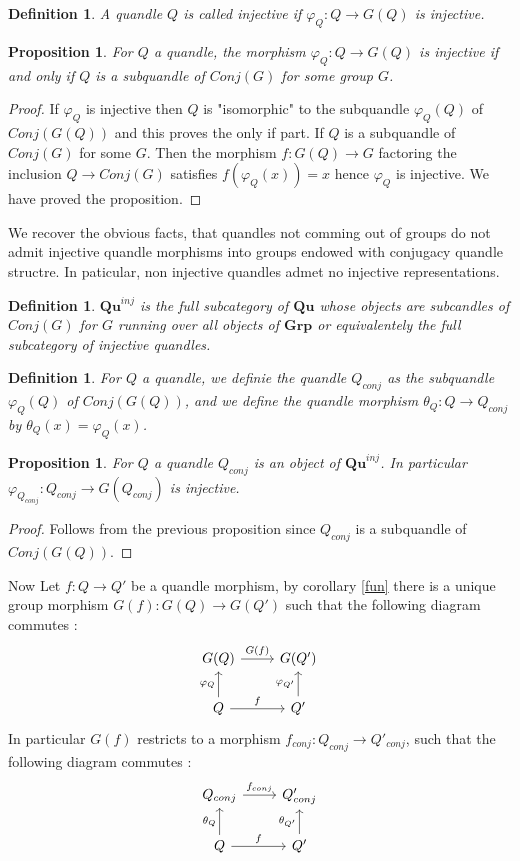 \documentclass[12pt, reqno]{amsart}
\newtheorem{proposition}[theorem]{Proposition}
\newtheorem{definition}[theorem]{Definition}
\newcommand{\Q}{{\mathbf{Qu}}}
\newcommand{\G}{{\mathbf{Grp}}}
\begin{document}
\begin{definition}
A quandle $Q$ is called injective if $\varphi_Q :Q \to G(Q)$ is injective. 
\end{definition}
\begin{proposition}
For $Q$ a quandle, the morphism $\varphi_Q:Q\to G(Q)$ is injective if and only if $Q$ is a subquandle of $Conj(G)$ for some group $G$.
\end{proposition}
\begin{proof}
If $\varphi_Q$ is injective then $Q$ is "isomorphic" to the subquandle $\varphi_Q(Q)$ of $Conj(G(Q))$ and this proves the only if part. If $Q$ is a subquandle of $Conj(G)$ for some $G$. Then the morphism $f:G(Q)\to G$ factoring the inclusion $Q\to Conj(G)$ satisfies $f(\varphi_Q(x))=x$ hence $\varphi_Q$ is injective. We have proved the proposition.
\end{proof}
We recover the obvious facts, that quandles not comming out of groups do not admit injective quandle morphisms into groups endowed with conjugacy quandle structre. In paticular, non injective quandles admet no injective representations.
\begin{definition}
$\Q^{inj}$ is the full subcategory of $\Q$ whose objects are subcandles of $Conj(G)$ for $G$ running over all objects of $\G$ or equivalentely the full subcategory of injective quandles.
\end{definition}
 
\begin{definition}
For $Q$ a quandle, we definie the quandle $Q_{conj}$ as the subquandle $\varphi_Q(Q)$ of $Conj(G(Q))$, and we define the quandle morphism $\theta_Q :Q\to Q_{conj}$ by $\theta_Q(x)=\varphi_Q(x)$.
\end{definition}
\begin{proposition}
For $Q$ a quandle $Q_{conj}$ is an object of $\Q^{inj}$. In particular $\varphi_{Q_{conj}}:Q_{conj}\to G(Q_{conj})$ is injective.
\end{proposition}
\begin{proof}
Follows from the previous proposition since $Q_{conj}$ is a subquandle of $Conj(G(Q))$.
\end{proof}
Now Let $f:Q\to Q'$ be a quandle morphism, by corollary \ref{fun} there is a unique group morphism $G(f) : G(Q) \to G(Q')$  such that   the following diagram commutes : 
$$\begin{tikzcd}
G(Q) \arrow{r}{G(f)} &G(Q')  \\ 
Q\arrow{u}{\varphi_Q} \arrow{r}{f} & Q'\arrow{u}{\varphi_{Q'}} 
\end{tikzcd} $$
In particular $G(f)$ restricts to a morphism $f_{conj} :Q_{conj} \to Q'_{conj}$, such that the following diagram commutes :
\begin{equation}\label{diag}\begin{tikzcd}
Q_{conj} \arrow{r}{f_{conj}} &Q'_{conj}  \\ 
Q\arrow{u}{\theta_Q} \arrow{r}{f} & Q'\arrow{u}{\theta_{Q'}} 
\end{tikzcd} 
\end{equation}
\end{document}
